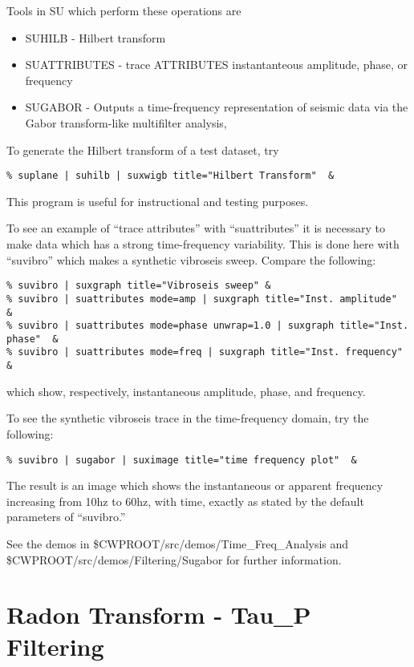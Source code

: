 {{{{{{{Tools in SU which perform these operations are
\begin{itemize}
\item SUHILB - Hilbert transform 
\item SUATTRIBUTES - trace ATTRIBUTES instantanteous amplitude, phase, or frequency 
\item SUGABOR -  Outputs a time-frequency representation of seismic data via
the Gabor transform-like multifilter analysis,
\end{itemize}
To generate the Hilbert transform of a test dataset, try
{\small \begin{verbatim}
% suplane | suhilb | suxwigb title="Hilbert Transform"  &
\end{verbatim}}\noindent
This program is useful for instructional and testing purposes.

To see an example of ``trace attributes'' with ``suattributes''
it is necessary to make data which has a strong time-frequency
variability. This is done here with ``suvibro'' which makes a
synthetic vibroseis sweep. Compare the following:
{\small \begin{verbatim}
% suvibro | suxgraph title="Vibroseis sweep" &
% suvibro | suattributes mode=amp | suxgraph title="Inst. amplitude"  &
% suvibro | suattributes mode=phase unwrap=1.0 | suxgraph title="Inst. phase"  &
% suvibro | suattributes mode=freq | suxgraph title="Inst. frequency"  &
\end{verbatim}}\noindent
which show, respectively, instantaneous amplitude, phase, and frequency.

To see the synthetic vibroseis trace in the time-frequency domain,
try the following:
{\small \begin{verbatim}
% suvibro | sugabor | suximage title="time frequency plot"  &
\end{verbatim}}\noindent
The result is an image which shows the instantaneous or apparent
frequency increasing from 10hz to 60hz, with time, exactly as
stated by the default parameters of ``suvibro.''

See the demos in \$CWPROOT/src/demos/Time\_Freq\_Analysis
and \$CWPROOT/src/demos/Filtering/Sugabor
for further information.

\section{Radon Transform - Tau\_P Filtering}

}}}}}}}
